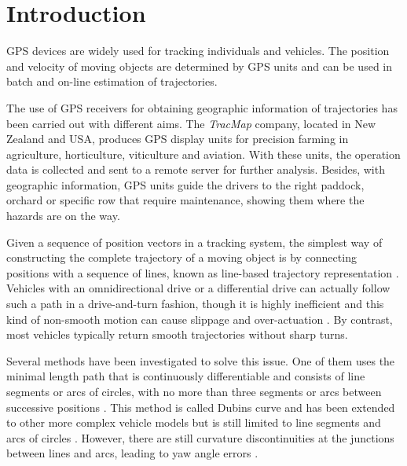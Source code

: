 
\section{Introduction}

GPS devices are widely used for tracking individuals and vehicles. The position and velocity of moving objects are determined by GPS units and can be used in batch and on-line estimation of trajectories. 

The use of GPS receivers for obtaining geographic information of trajectories has been carried out with different aims. The \textit{TracMap} company, located in New Zealand and USA, produces GPS display units for precision farming in agriculture, horticulture, viticulture and aviation. With these units, the operation data is collected and sent to a remote server for further analysis. Besides, with geographic information, GPS units guide the drivers to the right paddock, orchard or specific row that require maintenance, showing them where the hazards are on the way. 


Given a sequence of position vectors in a tracking system, the simplest way of constructing the complete trajectory of a moving object is by connecting positions with a sequence of lines, known as line-based trajectory representation \citep{agarwal2003indexing}. Vehicles with an omnidirectional drive or a differential drive can actually follow such a path in a drive-and-turn fashion, though it is highly inefficient \citep{gloderer2010spline} and this kind of non-smooth motion can cause slippage and over-actuation \citep{magid2006spline}. By contrast, most vehicles typically return smooth trajectories without sharp turns. 

Several methods have been investigated to solve this issue. One of them uses the minimal length path that is continuously differentiable and consists of line segments or arcs of circles, with no more than three segments or arcs between successive positions \citep{dubins1957curves}. This method is called Dubins curve and has been extended to other more complex vehicle models but is still limited to line segments and arcs of circles \citep{yang2010analytical}. However, there are still curvature discontinuities at the junctions between lines and arcs, leading to yaw angle errors \citep{wang2017curvature}. 

